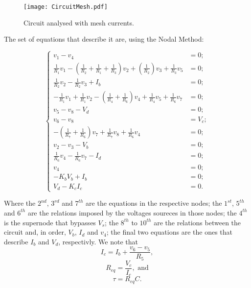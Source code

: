 \begin{figure}[h] \centering
\texttt{[image: CircuitMesh.pdf]}
\caption{Circuit analysed with mesh currents.}
\label{fig:Circuit_Passo2}
\end{figure}

The set of equations that describe it are, using the Nodal Method:

\begin{equation}
\begin{cases}
	v_1 - v_4 &= 0;																				  	  \\
	\frac{1}{R_1}v_1 - (\frac{1}{R_2}+\frac{1}{R_1}+\frac{1}{R_3})v_2 + (\frac{1}{R_2})v_3 + \frac{1}{R_3}v_5 &= 0; \\
  	\frac{1}{R_2}v_2 - \frac{1}{R_2}v_3+ I_b &= 0;													  \\
  	-\frac{1}{R_1}v_1 + \frac{1}{R_1}v_2 - (\frac{1}{R_4}+\frac{1}{R_6})v_4 + \frac{1}{R_4}v_5 + \frac{1}{R_6}v_7 &= 0;			  																	  \\
	v_5 - v_8 - V_d &= 0;																			  \\
  	v_6 - v_8  &= V_c;											  	  							  \\
  	-(\frac{1}{R_7}+\frac{1}{R_6})v_7 + \frac{1}{R_7}v_8 + \frac{1}{R_6}v_4 &= 0;					  \\
	v_2 - v_3 - V_b &= 0;																			  \\
  	\frac{1}{R_6}v_4 - \frac{1}{R_6}v_7 - I_d &= 0;													  \\
  	v_4 &= 0;																						  \\
  	-K_bV_b + I_b &= 0;																				  \\
  	V_d - K_cI_c &= 0.
\end{cases}
\end{equation}

Where the $2^{nd}$, $3^{rd}$ and $7^{th}$ are the equations in the respective nodes; the $1^{st}$, $5^{th}$ and $6^{th}$ are the relations imposed by the voltages soureces in those nodes; the $4^{th}$ is the supernode that bypasses $V_s$; the $8^{th}$ to $10^{th}$ are the relations between the circuit and, in order, $V_b$, $I_d$ and $v_4$; the final two equations are the ones that describe $I_b$ and $V_d$, respectivly. 
We note that 
\begin{equation}
	I_c = I_b + \frac{v_6-v_5}{R_5},
\end{equation}
\begin{equation}
	R_{eq} = \frac{V_c}{I_c}, \text{ and}
\end{equation}
\begin{equation}
	\tau = R_{eq}C.
\end{equation}


